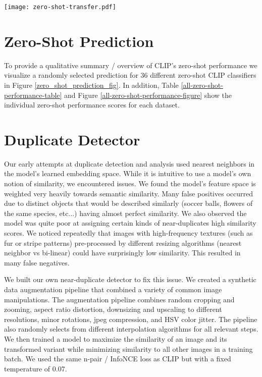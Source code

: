 \documentclass{article}
\begin{document}
\begin{table*}[]
\begin{tabular}{cc|cccccccccccccccccccccccccccc}
        \\
        \bottomrule
    \end{tabular}
    \caption{Zero-shot performance of CLIP models over 27 datasets.}
    \label{tab:zero-shot-big-table}
\clearpage{}
\label{all-zero-shot-performance-table}
\vspace{2em}
\texttt{[image: zero-shot-transfer.pdf]}
 \label{all-zero-shot-performance-figure}
\end{table*}

\clearpage


\section{Zero-Shot Prediction}

To provide a qualitative summary / overview of CLIP's zero-shot performance we visualize a randomly selected prediction for 36 different zero-shot CLIP classifiers in Figure \ref{zero_shot_prediction_fig}. 
In addition, Table \ref{all-zero-shot-performance-table} and Figure \ref{all-zero-shot-performance-figure} show the individual zero-shot performance scores for each dataset.

\section{Duplicate Detector}
\label{dupdet}

Our early attempts at duplicate detection and analysis used nearest neighbors in the model's learned embedding space. While it is intuitive to use a model's own notion of similarity, we encountered issues. We found the model's feature space is weighted very heavily towards semantic similarity. Many false positives occurred due to distinct objects that would be described similarly (soccer balls, flowers of the same species, etc...) having almost perfect similarity. We also observed the model was quite poor at assigning certain kinds of near-duplicates high similarity scores. We noticed repeatedly that images with high-frequency textures (such as fur or stripe patterns) pre-processed by different resizing algorithms (nearest neighbor vs bi-linear) could have surprisingly low similarity. This resulted in many false negatives. 

We built our own near-duplicate detector to fix this issue. We created a synthetic data augmentation pipeline that combined a variety of common image manipulations. The augmentation pipeline combines random cropping and zooming, aspect ratio distortion, downsizing and upscaling to different resolutions, minor rotations, jpeg compression, and HSV color jitter. The pipeline also randomly selects from different interpolation algorithms for all relevant steps. We then trained a model to maximize the similarity of an image and its transformed variant while minimizing similarity to all other images in a training batch. We used the same n-pair / InfoNCE loss as CLIP but with a fixed temperature of 0.07.
\end{document}
